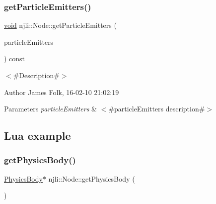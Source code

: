 \subsubsection{\texorpdfstring{get\+Particle\+Emitters()}{getParticleEmitters()}}
{\footnotesize\ttfamily \mbox{\hyperlink{_thread_8h_af1e856da2e658414cb2456cb6f7ebc66}{void}} njli\+::\+Node\+::get\+Particle\+Emitters (\begin{DoxyParamCaption}\item[{std\+::vector$<$ \mbox{\hyperlink{classnjli_1_1_particle_emitter}{Particle\+Emitter}} $\ast$$>$ \&}]{particle\+Emitters }\end{DoxyParamCaption}) const}



$<$\#\+Description\#$>$ 

\begin{DoxyAuthor}{Author}
James Folk, 16-\/02-\/10 21\+:02\+:19
\end{DoxyAuthor}

\begin{DoxyParams}{Parameters}
{\em particle\+Emitters} & $<$\#particle\+Emitters description\#$>$\\
\hline
\end{DoxyParams}
\hypertarget{classnjli_1_1_steering_behavior_wander_ex1}{}\subsection{Lua example}\label{classnjli_1_1_steering_behavior_wander_ex1}

\begin{DoxyCodeInclude}
\end{DoxyCodeInclude}
\mbox{\label{classnjli_1_1_node_addb4eaa36fd97ae32b53b421c83408a0}} 
\subsubsection{\texorpdfstring{get\+Physics\+Body()}{getPhysicsBody()}\hspace{0.1cm}{\footnotesize\ttfamily [1/2]}}
{\footnotesize\ttfamily \mbox{\hyperlink{classnjli_1_1_physics_body}{Physics\+Body}}$\ast$ njli\+::\+Node\+::get\+Physics\+Body (\begin{DoxyParamCaption}{ }\end{DoxyParamCaption})}



